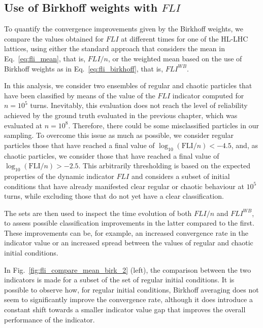 \subsection{Use of Birkhoff weights with $FLI$}\label{subsec:lhc_fli_bk}

To quantify the convergence improvements given by the Birkhoff weights, we compare the values obtained for $FLI$ at different times for one of the HL-LHC lattices, using either the standard approach that considers the mean in Eq.~\eqref{eq:fli_mean}, that is, $FLI/n$, or the weighted mean based on the use of Birkhoff weights as in Eq.~\eqref{eq:fli_birkhoff}, that is, $FLI^{WB}$.

In this analysis, we consider two ensembles of regular and chaotic particles that have been classified by means of the value of the $FLI$ indicator computed for $n=10^5$ turns. Inevitably, this evaluation does not reach the level of reliability achieved by the ground truth evaluated in the previous chapter, which was evaluated at $n=10^8$. Therefore, there could be some misclassified particles in our sampling. To overcome this issue as much as possible, we consider regular particles those that have reached a final value of $\log_{10}(\mathrm{FLI}/n) < -4.5$, and, as chaotic particles, we consider those that have reached a final value of $\log_{10}(\mathrm{FLI}/n) > -2.5$. This arbitrarily thresholding is based on the expected properties of the dynamic indicator $FLI$ and considers a subset of initial conditions that have already manifested clear regular or chaotic behaviour at $10^5$ turns, while excluding those that do not yet have a clear classification.

The sets are then used to inspect the time evolution of both $FLI/n$ and $FLI^{WB}$, to assess possible classification improvements in the latter compared to the first. These improvements can be, for example, an increased convergence rate in the indicator value or an increased spread between the values of regular and chaotic initial conditions.

In Fig.~\ref{fig:fli_compare_mean_birk_2} (left), the comparison between the two indicators is made for a subset of the set of regular initial conditions. It is possible to observe how, for regular initial conditions, Birkhoff averaging does not seem to significantly improve the convergence rate, although it does introduce a constant shift towards a smaller indicator value gap that improves the overall performance of the indicator.

